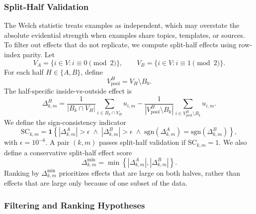 \documentclass{article} %
\begin{document}
\subsubsection{Split-Half Validation}
\label{app:ftd-splithalf}

The Welch statistic treats examples as independent, which may overstate the absolute evidential strength when examples share topics, templates, or sources. To filter out effects that do not replicate, we compute split-half effects using row-index parity. Let
\begin{equation}
V_A = \{i\in V : i \equiv 0 \pmod{2}\}, \qquad V_B = \{i\in V : i \equiv 1 \pmod{2}\}.
\end{equation}
For each half $H\in\{A,B\}$, define
\begin{equation}
V^H_{\text{pool}} = V_H \setminus B_0.
\end{equation}
The half-specific inside-vs-outside effect is
\begin{equation}
\Delta^H_{k,m} = \frac{1}{|B_k\cap V_H|}\sum_{i\in B_k\cap V_H}u_{i,m} - \frac{1}{|V^H_{\text{pool}}\setminus B_k|}\sum_{i\in V^H_{\text{pool}}\setminus B_k}u_{i,m}.
\end{equation}
We define the sign-consistency indicator
\begin{equation}
\text{SC}_{k,m} = \mathbf{1}\left\{|\Delta^A_{k,m}|>\epsilon \;\wedge\; |\Delta^B_{k,m}|>\epsilon \;\wedge\; \text{sgn}(\Delta^A_{k,m})=\text{sgn}(\Delta^B_{k,m})\right\},
\end{equation}
with $\epsilon=10^{-6}$. A pair $(k,m)$ passes split-half validation if $\text{SC}_{k,m}=1$. We also define a conservative split-half effect score
\begin{equation}
\Delta^{\min}_{k,m} = \min\left\{|\Delta^A_{k,m}|,|\Delta^B_{k,m}|\right\}.
\end{equation}
Ranking by $\Delta^{\min}_{k,m}$ prioritizes effects that are large on both halves, rather than effects that are large only because of one subset of the data.

\subsubsection{Filtering and Ranking Hypotheses}
\label{app:ftd-filtering-ranking}
\end{document}
